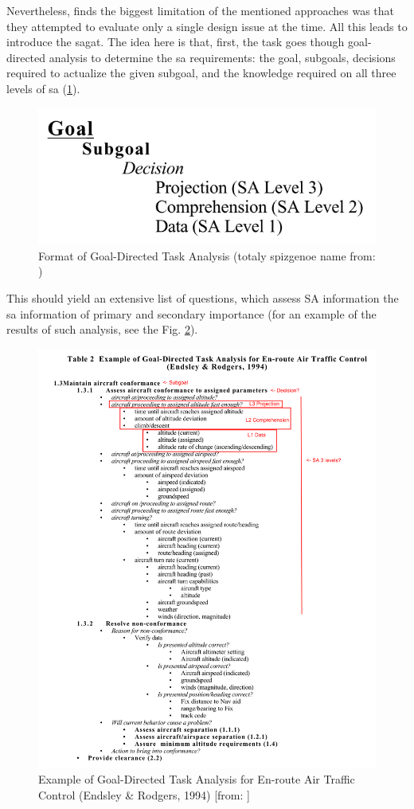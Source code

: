 Nevertheless, \cite{endsley_situation_1988} finds the biggest limitation of the mentioned approaches was that they attempted to evaluate only a single design issue at the time. All this leads \cite{endsley_situation_1988} to introduce the \gls{sagat}. The idea here is that, first, the task goes though goal-directed analysis to determine the \gls{sa} requirements: the goal, subgoals, decisions required to actualize the given subgoal, and the knowledge required on all three levels of \gls{sa} (\ref{fig:sagoalorientedtaskanalysis}). 
\begin{figure}
	\centering
	\includegraphics[width=0.7\linewidth]{figures/placeholders/SA_goal_oriented_task_analysis}
	\caption{Format of Goal-Directed Task Analysis (totaly spizgenoe name from: \cite{endsley_direct_nodate})}
	\label{fig:sagoalorientedtaskanalysis}
\end{figure}
This should yield an extensive list of questions, which assess SA information the \gls{sa} information of primary and secondary importance (for an example of the results of such analysis, see the Fig. \ref{fig:sagoalorientedtaskanalysisresultexample}).
\begin{figure}
	\centering
	\includegraphics[width=0.7\linewidth]{figures/placeholders/SA_goal_oriented_task_analysis_result_example}
	\caption{Example of Goal-Directed Task Analysis for En-route Air Traffic Control (Endsley \& Rodgers, 1994) [from: \cite{endsley_direct_nodate}]}
	\label{fig:sagoalorientedtaskanalysisresultexample}
\end{figure}
